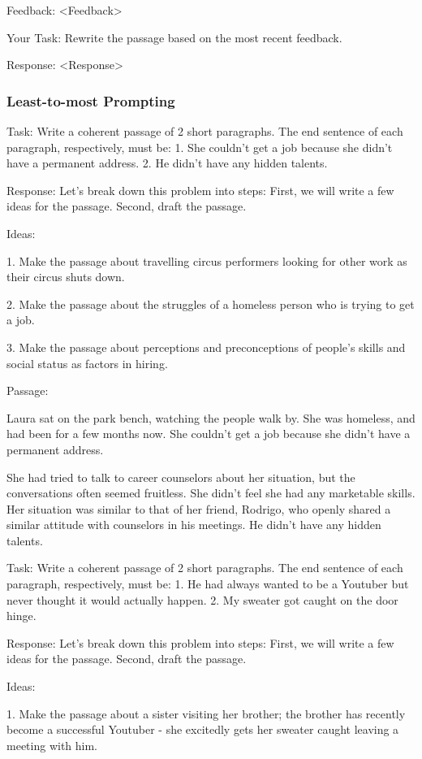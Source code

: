 \documentclass[11pt]{article}
\begin{document}
Feedback: <Feedback>

Your Task: Rewrite the passage based on the most recent feedback.

Response: <Response>

\subsubsection*{Least-to-most Prompting}

Task: Write a coherent passage of 2 short paragraphs. The end sentence of each paragraph, respectively, must be: 1. She couldn't get a job because she didn't have a permanent address. 2. He didn't have any hidden talents.

Response: Let's break down this problem into steps: First, we will write a few ideas for the passage. Second, draft the passage.

Ideas:

1. Make the passage about travelling circus performers looking for other work as their circus shuts down.

2. Make the passage about the struggles of a homeless person who is trying to get a job. 

3. Make the passage about perceptions and preconceptions of people's skills and social status as factors in hiring.

Passage: 

Laura sat on the park bench, watching the people walk by. She was homeless, and had been for a few months now. She couldn't get a job because she didn't have a permanent address.

She had tried to talk to career counselors about her situation, but the conversations often seemed fruitless. She didn't feel she had any marketable skills. Her situation was similar to that of her friend, Rodrigo, who openly shared a similar attitude with counselors in his meetings. He didn't have any hidden talents.

Task: Write a coherent passage of 2 short paragraphs. The end sentence of each paragraph, respectively, must be: 1. He had always wanted to be a Youtuber but never thought it would actually happen. 2. My sweater got caught on the door hinge.

Response: Let's break down this problem into steps: First, we will write a few ideas for the passage. Second, draft the passage.

Ideas:

1. Make the passage about a sister visiting her brother; the brother has recently become a successful Youtuber - she excitedly gets her sweater caught leaving a meeting with him.
\end{document}
